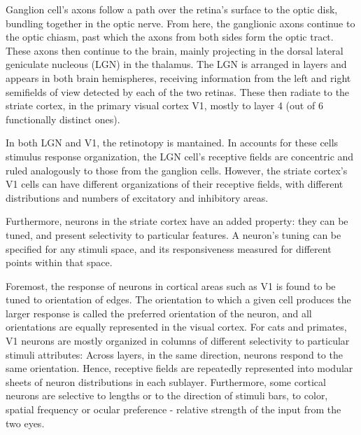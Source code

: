 Ganglion cell's axons follow a path over the retina's surface to the optic disk, bundling together in the optic nerve. %
From here, the ganglionic axons continue to the optic chiasm, past which the axons from both sides form the optic tract. These axons then continue to the brain, mainly projecting in the dorsal lateral geniculate nucleous (LGN) in the thalamus. The LGN is arranged in layers and appears in both brain hemispheres,  receiving information from the left and right semifields of view detected by each of the two retinas. These then radiate to the striate cortex, in the primary visual cortex V1, mostly to layer 4 (out of 6 functionally distinct ones).


In both LGN and V1, the retinotopy is mantained.
In accounts for these cells stimulus response organization, the LGN cell's receptive fields are concentric and ruled analogously to those from the ganglion cells. 
However, the striate cortex's V1 cells can have different organizations of their receptive fields, with different distributions and numbers of excitatory and inhibitory areas. 

Furthermore, neurons in the striate cortex have an added property: they can be tuned, and present selectivity to particular features. A neuron's tuning can be specified for any stimuli space, and its responsiveness measured for different points within that space. 

Foremost, the response of neurons in cortical areas such as V1 is found to be tuned to orientation of edges. The orientation to which a given cell produces the larger response is called the preferred orientation of the neuron, and all orientations are equally represented in the visual cortex. For cats and primates, V1 neurons are mostly organized in columns of different selectivity to particular stimuli attributes: Across layers, in the same direction, neurons respond to the same orientation. Hence, receptive fields are repeatedly represented into modular sheets of neuron distributions in each sublayer. Furthermore, some cortical neurons are selective to lengths or to the direction of stimuli bars, to color, spatial frequency or ocular preference - relative strength of the input from the two eyes. 

